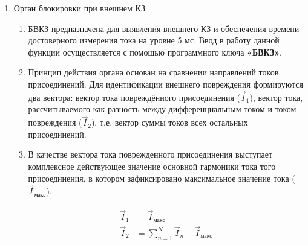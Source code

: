 \begin{enumerate}[label=\arabic{section}.\arabic{subsection}.\arabic{enumi}, labelsep=4pt, leftmargin=0pt, itemindent=57pt, itemsep=0pt, parsep=5pt]
\begin{enumerate}[label=\arabic{section}.\arabic{subsection}.\arabic{enumi}.\arabic*, labelsep=4pt, leftmargin=0em, itemindent=65pt, parsep=0pt]
\item
Выпрямленный мгновенный дифференциальный ток рассчитывается как модуль суммы мгновенных значений токов присоединений, входящих в зону действия защиты:
\begin{align}
i_{a\textmd{д}}=\mid \sum_{n=1}^N i_{a,\,n} \mid, \\
i_{b\textmd{д}}=\mid \sum_{n=1}^N i_{b,\,n} \mid, \\
i_{c\textmd{д}}=\mid \sum_{n=1}^N i_{c,\,n} \mid,
\end{align}

\end{enumerate}


\item Орган блокировки при внешнем КЗ

\begin{enumerate}[label=\arabic{section}.\arabic{subsection}.\arabic{enumi}.\arabic*, labelsep=4pt, leftmargin=0em, itemindent=65pt, parsep=0pt]

\item
БВКЗ предназначена для выявления внешнего КЗ и обеспечения времени достоверного измерения тока на уровне 5 мс.
Ввод в работу данной функции осуществляется с помощью программного ключа \textbf{«БВКЗ»}.

\item
Принцип действия органа основан на сравнении направлений токов присоединений.
Для идентификации внешнего повреждения формируются два вектора: вектор тока повреждённого присоединения ($ \vec{I}_1 $), вектор тока, рассчитываемого как разность между дифференциальным током и током повреждения ($ \vec{I}_2 $), т.е. вектор суммы токов всех остальных присоединений.

\item
В качестве вектора тока поврежденного присоединения выступает комплексное действующее значение основной гармоники тока того присоединения, в котором зафиксировано максимальное значение тока ($ \vec{I}_\textit{макс} $).

\begin{align}
\begin{split}
\vec{I}_1&=\vec{I}_\textit{макс}\\
\vec{I}_2&=\sum_{n=1}^N \vec{I}_{n} - \vec{I}_\textit{макс}
\end{split}
\end{align}


\end{enumerate}
\end{enumerate}
